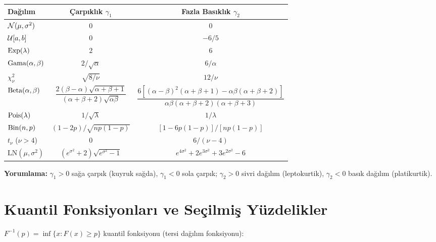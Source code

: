 \begin{center}
\renewcommand{\arraystretch}{1.6}
\small
\begin{tabular}{p{3cm}cc}
\hline
\textbf{Dağılım} & \textbf{Çarpıklık} $\gamma_1$ & \textbf{Fazla Basıklık} $\gamma_2$ \\
\hline
$\mathcal{N}(\mu,\sigma^2)$ & $0$ & $0$ \\
$\mathcal{U}[a,b]$ & $0$ & $-6/5$ \\
$\operatorname{Exp}(\lambda)$ & $2$ & $6$ \\
$\operatorname{Gama}(\alpha,\beta)$ & $2/\sqrt{\alpha}$ & $6/\alpha$ \\
$\chi^2_\nu$ & $\sqrt{8/\nu}$ & $12/\nu$ \\
$\operatorname{Beta}(\alpha,\beta)$ & $\dfrac{2(\beta-\alpha)\sqrt{\alpha+\beta+1}}{(\alpha+\beta+2)\sqrt{\alpha\beta}}$ & $\dfrac{6[(\alpha-\beta)^2(\alpha+\beta+1)-\alpha\beta(\alpha+\beta+2)]}{\alpha\beta(\alpha+\beta+2)(\alpha+\beta+3)}$ \\
$\operatorname{Pois}(\lambda)$ & $1/\sqrt{\lambda}$ & $1/\lambda$ \\
$\operatorname{Bin}(n,p)$ & $(1-2p)/\sqrt{np(1-p)}$ & $[1-6p(1-p)]/[np(1-p)]$ \\
$t_\nu$ ($\nu>4$) & $0$ & $6/(\nu-4)$ \\
$\mathrm{LN}(\mu,\sigma^2)$ & $(e^{\sigma^2}+2)\sqrt{e^{\sigma^2}-1}$ & $e^{4\sigma^2}+2e^{3\sigma^2}+3e^{2\sigma^2}-6$ \\
\hline
\end{tabular}
\end{center}

\noindent\textbf{Yorumlama:} $\gamma_1>0$ sağa çarpık (kuyruk sağda), $\gamma_1<0$ sola çarpık; $\gamma_2>0$ sivri dağılım (leptokurtik), $\gamma_2<0$ basık dağılım (platikurtik).

\section{Kuantil Fonksiyonları ve Seçilmiş Yüzdelikler}
\label{app:kuantil_fonk}

$F^{-1}(p) = \inf\{x : F(x)\geq p\}$ kuantil fonksiyonu (tersi dağılım fonksiyonu):

